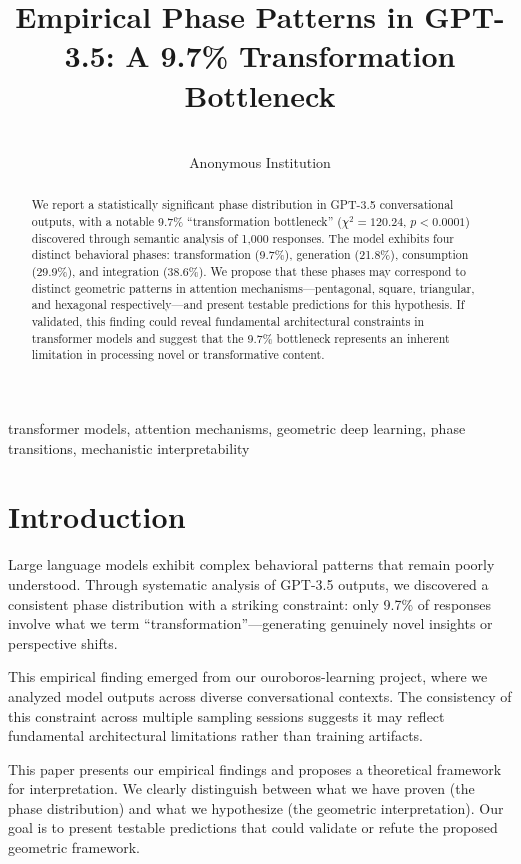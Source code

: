 \documentclass[mlmain]{jmlr}
\title[GPT-3.5 Phase Patterns]{Empirical Phase Patterns in GPT-3.5: A 9.7\% Transformation Bottleneck}
\author{\Name{Anonymous Author} \Email{anonymous@anonymous.edu}\\
\addr Anonymous Institution}
\begin{document}
\maketitle

\begin{abstract}
We report a statistically significant phase distribution in GPT-3.5 conversational outputs, with a notable 9.7\% ``transformation bottleneck'' ($\chi^2 = 120.24$, $p < 0.0001$) discovered through semantic analysis of 1,000 responses. The model exhibits four distinct behavioral phases: transformation (9.7\%), generation (21.8\%), consumption (29.9\%), and integration (38.6\%). We propose that these phases may correspond to distinct geometric patterns in attention mechanisms---pentagonal, square, triangular, and hexagonal respectively---and present testable predictions for this hypothesis. If validated, this finding could reveal fundamental architectural constraints in transformer models and suggest that the 9.7\% bottleneck represents an inherent limitation in processing novel or transformative content.
\end{abstract}

\begin{keywords}
transformer models, attention mechanisms, geometric deep learning, phase transitions, mechanistic interpretability
\end{keywords}

\section{Introduction}
\label{sec:intro}

Large language models exhibit complex behavioral patterns that remain poorly understood. Through systematic analysis of GPT-3.5 outputs, we discovered a consistent phase distribution with a striking constraint: only 9.7\% of responses involve what we term ``transformation''---generating genuinely novel insights or perspective shifts.

This empirical finding emerged from our ouroboros-learning project, where we analyzed model outputs across diverse conversational contexts. The consistency of this constraint across multiple sampling sessions suggests it may reflect fundamental architectural limitations rather than training artifacts.

This paper presents our empirical findings and proposes a theoretical framework for interpretation. We clearly distinguish between what we have proven (the phase distribution) and what we hypothesize (the geometric interpretation). Our goal is to present testable predictions that could validate or refute the proposed geometric framework.
\end{document}
